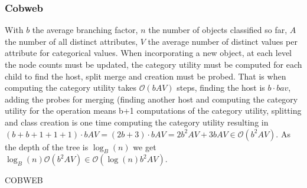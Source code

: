 \subsubsection{Cobweb}
With $b$ the average branching factor, $n$ the number of objects classified so far, $A$ the number of all distinct attributes, $V$ the average number of distinct values per attribute for categorical values. When incorporating a new object, at each level the node counts must be updated, the category utility must be computed for each child to find the host, split merge and creation must be probed. That is when computing the category utility takes $\mathcal{O}(bAV)$ steps, finding the host is $b \cdot bav$, adding the probes for merging (finding another host and computing the category utility for the operation means b+1 computations of the category utility, splitting and class creation is one time computing the category utility resulting in $(b + b + 1 + 1 + 1) \cdot bAV = (2b + 3) \cdot bAV = 2b^2AV + 3bAV \in \mathcal{O}(b^2AV)$. As the depth of the tree is $\log_B(n)$ we get $\log_B(n) \mathcal{O}(b^2AV) \in \mathcal{O}(\log (n)b^2 AV)$.
\begin{algorithm}[htp]
    \hrulealg
\caption{COBWEB}\label{cobweb_}
\end{algorithm}

